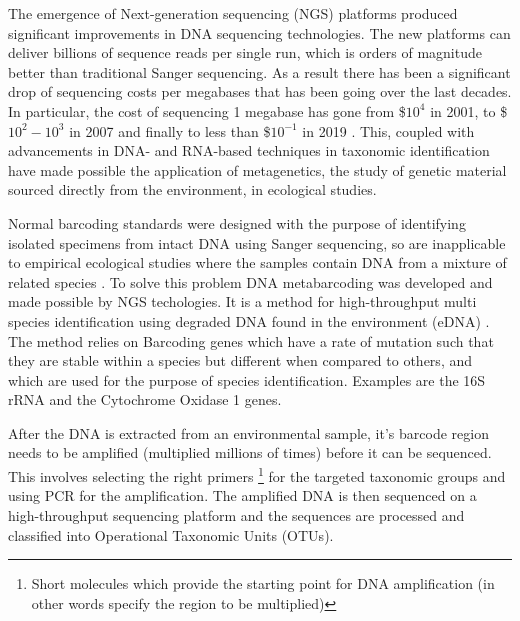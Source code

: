 The emergence of Next-generation sequencing (NGS) platforms produced significant improvements in DNA sequencing technologies. The new platforms can deliver billions of sequence reads per single run, which is orders of magnitude better than traditional Sanger sequencing. As a result there has been a significant drop of sequencing costs per megabases that has been going over the last decades. In particular, the cost of sequencing 1 megabase has gone from \$$10^4$ in 2001, to \$$10^2 - 10^3$ in 2007 and finally to less than \$$10^{-1}$ in 2019 \cite{sequencing_costs}. This, coupled with advancements in DNA- and RNA-based techniques in taxonomic identification \cite{baird_biomonitoring_2012} have made possible the application of metagenetics, the study of genetic material sourced directly from the environment, in ecological studies. 

Normal barcoding standards were designed with the purpose of identifying isolated specimens from intact DNA using Sanger sequencing, so are inapplicable to empirical ecological studies where the samples contain DNA from a mixture of related species  \cite{taberlet_towards_2012}. To solve this problem DNA metabarcoding was developed and made possible by NGS techologies. It is a method for high-throughput multi species identification using degraded DNA found in the environment (eDNA) \cite{taberlet_towards_2012}. The method relies on Barcoding genes which have a rate of mutation such that they are stable within a species but different when compared to others, and which are used for the purpose of species identification. Examples are the 16S rRNA and the Cytochrome Oxidase 1 \cite{hebert_paul_d._n._biological_2003} genes. 

After the DNA is extracted from an environmental sample, it's barcode region needs to be amplified (multiplied millions of times) before it can be sequenced. This involves selecting the right primers \footnote{Short molecules which provide the starting point for DNA amplification (in other words specify the region to be multiplied)} for the targeted taxonomic groups and using PCR for the amplification. The amplified DNA is then sequenced on a high-throughput sequencing platform and the sequences are processed and classified into Operational Taxonomic Units (OTUs). 

